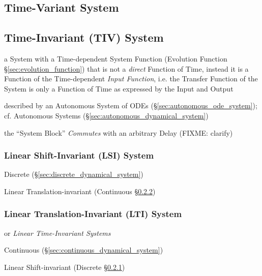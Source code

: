 \subsection{Time-Variant System}\label{sec:time_variant_system}

\subsection{Time-Invariant (TIV) System}\label{sec:tiv_system}

a System with a Time-dependent System Function (Evolution Function
\S\ref{sec:evolution_function}) that is not a \emph{direct} Function of Time,
instead it is a Function of the Time-dependent \emph{Input Function}, i.e. the
Transfer Function of the System is only a Function of Time as expressed by the
Input and Output

described by an Autonomous System of ODEs (\S\ref{sec:autonomous_ode_system});
cf. Autonomous Systems (\S\ref{sec:autonomous_dynamical_system})

the ``System Block'' \emph{Commutes} with an arbitrary Delay (FIXME: clarify)



\subsubsection{Linear Shift-Invariant (LSI) System}\label{sec:lsi_system}

Discrete (\S\ref{sec:discrete_dynamical_system})

\fist Linear Translation-invariant (Continuous \S\ref{sec:lti_system})



\subsubsection{Linear Translation-Invariant (LTI) System}
\label{sec:lti_system}

or \emph{Linear Time-Invariant Systems}

Continuous (\S\ref{sec:continuous_dynamical_system})

\fist Linear Shift-invariant (Discrete \S\ref{sec:lsi_system})

